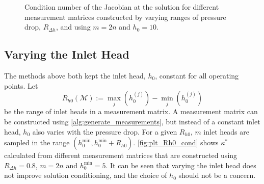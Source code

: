 \begin{figure}[ht]
    \centering
    
    \caption[Condition number at the solution for different ranges of pressure drop]{Condition number of the Jacobian at the solution for different measurement matrices constructed by varying ranges of pressure drop, $R_{\Delta h}$, and using $m=2n$ and $h_0=10$.}
    \label{fig:plt_Rdh_cond}
\end{figure}

\begin{algorithm}[H]
\caption{Generation of Measurements}
\label{alg:generate_measurements}
\DontPrintSemicolon
{}
\end{algorithm}

\FloatBarrier
\subsection{Varying the Inlet Head}

The methods above both kept the inlet head, $h_0$, constant for all operating points. Let
\begin{equation*}
    R_{h0}(\mathcal{M}) := \underset{j}{\max}(h_0^{(j)})-\underset{j}{\min}(h_0^{(j)})
\end{equation*}
be the range of inlet heads in a measurement matrix. A measurement matrix can be constructed using \autoref{alg:generate_measurements}, but instead of a constant inlet head, $h_0$ also varies with the pressure drop. For a given $R_{h0}$, $m$ inlet heads are sampled in the range $(h_0^{\min},h_0^{\min}+R_{h0})$. \autoref{fig:plt_Rh0_cond} shows $\kappa^*$ calculated from different measurement matrices that are constructed using $R_{\Delta h}=0.8$, $m=2n$ and $h_0^{\min}=5$. It can be seen that varying the inlet head does not improve solution conditioning, and the choice of $h_0$ should not be a concern.

